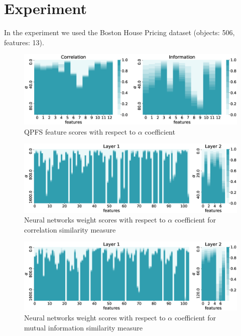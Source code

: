 \documentclass[a4paper,12pt]{article}
\theoremstyle{plain} %
\theoremstyle{definition} %
\theoremstyle{remark} %
\begin{document}
  	\section*{Experiment}
  	In the experiment we used the Boston House Pricing dataset (objects: 506, features: 13). 
  	
  	\begin{figure}[h]
  		\includegraphics[width=\linewidth]{figs/qpfs_corr_vs_info_wrt_alpha.eps}
  		\caption{QPFS feature scores with respect to $\alpha$ coefficient}
  		\label{fig:qpfs_corr_vs_info_wrt_alpha}
  	\end{figure}
  
   	\begin{figure}[h]
   		\includegraphics[width=\linewidth]{figs/qpfs_nn_corr_wrt_alpha.eps}	 
   		\caption{Neural networks weight scores with respect to $\alpha$ coefficient for correlation similarity measure}
   	\end{figure}	  
   
   \begin{figure}[!h]	
   	\includegraphics[width=\linewidth]{figs/qpfs_nn_info_wrt_alpha.eps}	 
   	\caption{Neural networks weight scores with respect to $\alpha$ coefficient for mutual information similarity measure}
   	\label{fig:qpfs_nn_info_wrt_alpha}
   \end{figure}	
\end{document}
